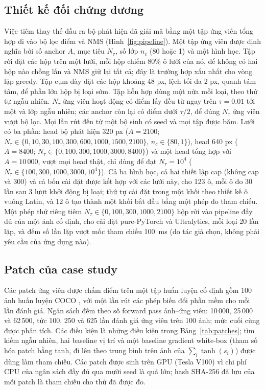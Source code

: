 \documentclass[a4paper,fleqn]{cas-dc}
\newcommand{\Ntau}{N_{\tau}}
\begin{document}
\subsection{Thiết kế đối chứng dương}
Việc tiêm thay thế đầu ra bộ phát hiện đã giải mã bằng một tập ứng viên tổng hợp đi vào bộ lọc điểm và NMS (Hình~\ref{fig:pipeline}). Một tập ứng viên được định nghĩa bởi số anchor $A$, mục tiêu $\Ntau$, số lớp $n_c$ (80 hoặc 1) và một hình học. Tập rời đặt các hộp trên một lưới, mỗi hộp chiếm 80\% ô lưới của nó, để không có hai hộp nào chồng lấn và NMS giữ lại tất cả; đây là trường hợp xấu nhất cho vòng lặp greedy. Tập cụm dày đặt các hộp khoảng 48 px, lệch tối đa 2 px, quanh tám tâm, để phần lớn hộp bị loại sớm. Tập hỗn hợp dùng một nửa mỗi loại, theo thứ tự ngẫu nhiên. $\Ntau$ ứng viên hoạt động có điểm lấy đều từ ngay trên $\tau=0.01$ tới một và lớp ngẫu nhiên; các anchor còn lại có điểm dưới $\tau/2$, để đúng $\Ntau$ ứng viên vượt bộ lọc. Mọi lần rút đến từ một bộ sinh có seed và mọi tập được băm. Lưới có ba phần: head bộ phát hiện 320 px ($A=2100$; $\Ntau\in\{0,10,30,100,300,600,1000,1500,2100\}$, $n_c\in\{80,1\}$), head 640 px ($A=8400$; $\Ntau\in\{0,100,300,1000,3000,8400\}$) và một head tổng hợp với $A=10\,000$, vượt mọi head thật, chỉ dùng để đạt $\Ntau=10^4$ ($\Ntau\in\{100,300,1000,3000,10^4\}$). Cả ba hình học, cả hai thiết lập cap (không cap và 300) và cả bốn cài đặt được kết hợp với các lưới này, cho 123 ô, mỗi ô đo 30 lần sau 3 lượt khởi động bị loại; thứ tự cài đặt trong một khối theo thiết kế ô vuông Latin, và 12 ô tạo thành một khối bắt đầu bằng một phép đo tham chiếu. Một phép thử riêng tiêm $\Ntau\in\{0,100,300,1000,2100\}$ hộp rời vào pipeline đầy đủ của một ảnh cố định, cho cài đặt pure-PyTorch và Ultralytics, mỗi loại 20 lần lặp, và đếm số lần lặp vượt mốc tham chiếu 100~ms (do tác giả chọn, không phải yêu cầu của ứng dụng nào).

\subsection{Patch của case study}
\label{sec:attackdesign}
Các patch ứng viên được chấm điểm trên một tập huấn luyện cố định gồm 100 ảnh huấn luyện COCO \cite{lin2014coco}, với một lần rút các phép biến đổi phần mềm cho mỗi lần đánh giá. Ngân sách đếm theo số forward pass ảnh--ứng viên: 10\,000, 25\,000 và 62\,500, tức 100, 250 và 625 lần đánh giá ứng viên trên 100 ảnh; mức cuối cùng được phân tích. Các điều kiện là những điều kiện trong Bảng~\ref{tab:patches}; tìm kiếm ngẫu nhiên, hai baseline vị trí và một baseline gradient white-box (tham số hóa patch bằng tanh, đi lên theo trung bình trên ảnh của $\sum_i \tanh(s_i)$) được dùng làm tham chiếu. Các patch được sinh trên GPU (Tesla V100) vì chi phí CPU của ngân sách đầy đủ qua mười seed là quá lớn; hash SHA-256 đã lưu của mỗi patch là tham chiếu cho thứ đã được đo.
\end{document}
